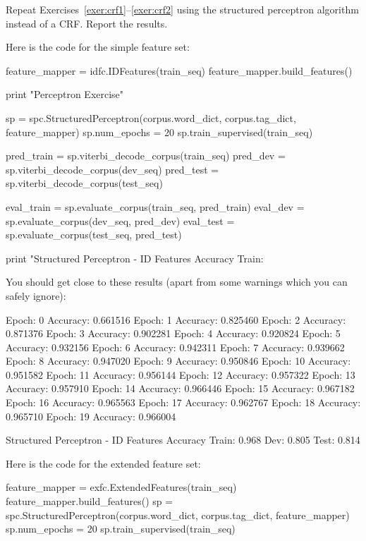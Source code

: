 \begin{exercise}
Repeat Exercises~\ref{exer:crf1}--\ref{exer:crf2} using the structured perceptron algorithm 
instead of a CRF. Report the results. 

Here is the code for the simple feature set:


\begin{python}
feature_mapper = idfc.IDFeatures(train_seq)
feature_mapper.build_features()

print "Perceptron Exercise"

sp = spc.StructuredPerceptron(corpus.word_dict, corpus.tag_dict, feature_mapper)
sp.num_epochs = 20
sp.train_supervised(train_seq)

pred_train = sp.viterbi_decode_corpus(train_seq)
pred_dev = sp.viterbi_decode_corpus(dev_seq)
pred_test = sp.viterbi_decode_corpus(test_seq)

eval_train = sp.evaluate_corpus(train_seq, pred_train)
eval_dev = sp.evaluate_corpus(dev_seq, pred_dev)
eval_test = sp.evaluate_corpus(test_seq, pred_test)

print "Structured Perceptron - ID Features Accuracy Train: %
\end{python}

You should get close to these results (apart from some warnings which you can safely ignore):
\begin{python}
Epoch: 0 Accuracy: 0.661516
Epoch: 1 Accuracy: 0.825460
Epoch: 2 Accuracy: 0.871376
Epoch: 3 Accuracy: 0.902281
Epoch: 4 Accuracy: 0.920824
Epoch: 5 Accuracy: 0.932156
Epoch: 6 Accuracy: 0.942311
Epoch: 7 Accuracy: 0.939662
Epoch: 8 Accuracy: 0.947020
Epoch: 9 Accuracy: 0.950846
Epoch: 10 Accuracy: 0.951582
Epoch: 11 Accuracy: 0.956144
Epoch: 12 Accuracy: 0.957322
Epoch: 13 Accuracy: 0.957910
Epoch: 14 Accuracy: 0.966446
Epoch: 15 Accuracy: 0.967182
Epoch: 16 Accuracy: 0.965563
Epoch: 17 Accuracy: 0.962767
Epoch: 18 Accuracy: 0.965710
Epoch: 19 Accuracy: 0.966004

Structured Perceptron - ID Features Accuracy Train: 0.968 Dev: 0.805 Test: 0.814
\end{python}

Here is the code for the extended feature set:

\begin{python}
feature_mapper = exfc.ExtendedFeatures(train_seq)
feature_mapper.build_features()
sp = spc.StructuredPerceptron(corpus.word_dict, corpus.tag_dict, feature_mapper)
sp.num_epochs = 20
sp.train_supervised(train_seq)


\end{python}
\end{exercise}
